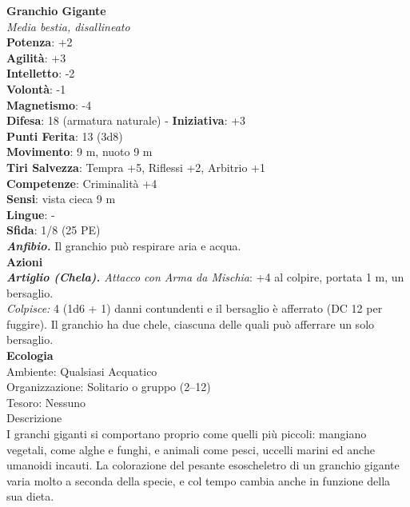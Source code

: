 \begin{multicols}{2}
\medskip\textbf{Granchio Gigante}\\
\emph{Media bestia, disallineato}\\
\textbf{Potenza}: +2\\
\textbf{Agilità}: +3\\
\textbf{Intelletto}: -2\\
\textbf{Volontà}: -1\\
\textbf{Magnetismo}: -4\\
\textbf{Difesa}: 18 (armatura naturale) - \textbf{Iniziativa}: +3\\
\textbf{Punti Ferita}: 13 (3d8)\\
\textbf{Movimento}: 9 m, nuoto 9 m\\
\textbf{Tiri Salvezza}: Tempra +5, Riflessi +2, Arbitrio +1 \\
\textbf{Competenze}: Criminalità +4\\
\textbf{Sensi}: vista cieca 9 m\\
\textbf{Lingue}: -\\
\textbf{Sfida}: 1/8 (25 PE)\smallskip\\
\emph{\textbf{Anfibio.}} Il granchio può respirare aria e acqua.\\
\smallskip\textbf{Azioni}\\
\emph{\textbf{Artiglio (Chela).} Attacco con Arma da Mischia}: +4 al colpire, portata 1 m,  un bersaglio.\\
\emph{Colpisce:} 4 (1d6 + 1) danni contundenti e il bersaglio è afferrato (DC  12 per fuggire). Il granchio ha due chele, ciascuna delle quali può afferrare un solo bersaglio.\\
\textbf{Ecologia}\\
Ambiente: Qualsiasi Acquatico\\
Organizzazione: Solitario o gruppo (2–12)\\
Tesoro: Nessuno\\
Descrizione\\

I granchi giganti si comportano proprio come quelli più piccoli: mangiano vegetali, come alghe e funghi, e animali come pesci, uccelli marini ed anche umanoidi incauti. La colorazione del pesante esoscheletro di un granchio gigante varia molto a seconda della specie, e col tempo cambia anche in funzione della sua dieta. \\


\end{multicols}
